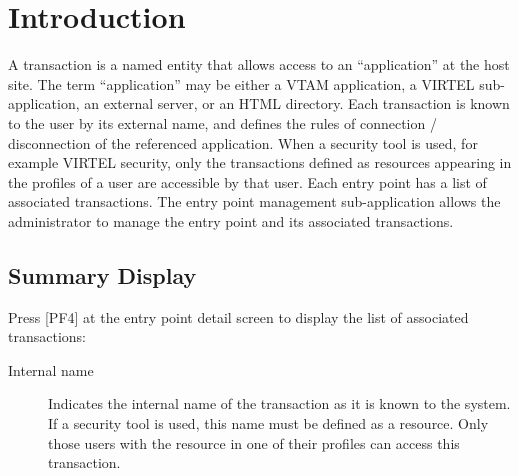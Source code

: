 \documentclass[letterpaper,10pt,english]{sphinxmanual}
\begin{document}
\section{Introduction}
\label{\detokenize{connectivity_guide:id61}}
A transaction is a named entity that allows access to an “application” at the host site. The term “application” may be either a VTAM application, a VIRTEL sub-application, an external server, or an HTML directory. Each transaction is known to the user by its external name, and defines the rules of connection / disconnection of the referenced application. When a security tool is used, for example VIRTEL security, only the transactions defined as resources appearing in the profiles of a user are accessible by that user. Each entry point has a list of associated transactions. The entry point management sub-application allows the administrator to manage the entry point and its associated transactions.


\subsection{Summary Display}
\label{\detokenize{connectivity_guide:id62}}\label{\detokenize{connectivity_guide:index-113}}
Press {[}PF4{]} at the entry point detail screen to display the list of associated transactions:


\begin{description}
\item[{Internal name}] \leavevmode
Indicates the internal name of the transaction as it is known to the system. If a security tool is used, this name must be defined as a resource. Only those users with the resource in one of their profiles can access this transaction.

\end{description}
\end{document}
